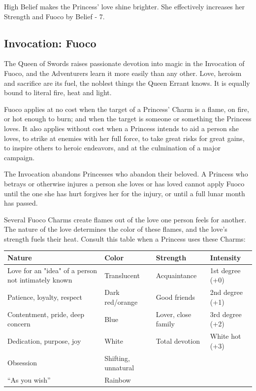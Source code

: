 High Belief makes the Princess' love shine brighter. She effectively increases her Strength and Fuoco by Belief - 7.

\subsection*{Invocation: Fuoco}

The Queen of Swords raises passionate devotion into magic in the Invocation of Fuoco, and the Adventurers learn it more easily than any other. Love, heroism and sacrifice are its fuel, the noblest things the Queen Errant knows. It is equally bound to literal fire, heat and light.

Fuoco applies at no cost when the target of a Princess' Charm is a flame, on fire, or hot enough to burn; and when the target is someone or something the Princess loves. It also applies without cost when a Princess intends to aid a person she loves, to strike at enemies with her full force, to take great risks for great gains, to inspire others to heroic endeavors, and at the culmination of a major campaign.

The Invocation abandons Princesses who abandon their beloved. A Princess who betrays or otherwise injures a person she loves or has loved cannot apply Fuoco until the one she has hurt forgives her for the injury, or until a full lunar month has passed.

Several Fuoco Charms create flames out of the love one person feels for another. The nature of the love determines the color of these flames, and the love's strength fuels their heat. Consult this table when a Princess uses these Charms: 

\begin{table}[H]
    \begin{tabularx}{\textwidth}{|X|l|l|l|}
        \hline
        Nature                                               & Color                & Strength             & Intensity        \\ \hline
        Love for an "idea" of a person not intimately known  & Translucent          & Acquaintance         & 1st degree (+0)  \\ \hline
        Patience, loyalty, respect                           & Dark red/orange      & Good friends         & 2nd degree (+1)  \\ \hline
        Contentment, pride, deep concern                     & Blue                 & Lover, close family  & 3rd degree (+2)  \\ \hline
        Dedication, purpose, joy                             & White                & Total devotion       & White hot (+3)   \\ \hline
        Obsession                                            & Shifting, unnatural  & ~                    & ~                \\ \hline
        \textquotedblleft As you wish\textquotedblright\,      & Rainbow              & ~                    & ~                \\
        \hline
    \end{tabularx}
\end{table}

